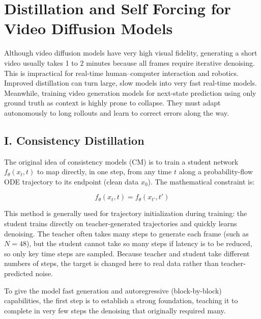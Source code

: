 \setcounter{section}{3}

\hypertarget{distillation-and-self-forcing-for-video-diffusion-models}{%
\section{Distillation and Self Forcing for Video Diffusion Models}\label{distillation-and-self-forcing-for-video-diffusion-models}}

Although video diffusion models have very high visual fidelity, generating a short video usually takes 1 to 2 minutes because all frames require iterative denoising. This is impractical for real-time human--computer interaction and robotics. Improved distillation can turn large, slow models into very fast real-time models. Meanwhile, training video generation models for next-state prediction using only ground truth as context is highly prone to collapse. They must adapt autonomously to long rollouts and learn to correct errors along the way.

\hypertarget{i.-consistency-distillation}{%
\subsection{I. Consistency Distillation}\label{i.-consistency-distillation}}

The original idea of consistency models (CM) is to train a student network \(f_\theta(x_t,t)\) to map directly, in one step, from any time \(t\) along a probability-flow ODE trajectory to its endpoint (clean data \(x_0\)). The mathematical constraint is:

\[
f_\theta(x_t,t)=f_\theta(x_{t'},t')
\]

This method is generally used for trajectory initialization during training: the student trains directly on teacher-generated trajectories and quickly learns denoising. The teacher often takes many steps to generate each frame (such as \(N=48\)), but the student cannot take so many steps if latency is to be reduced, so only key time steps are sampled. Because teacher and student take different numbers of steps, the target is changed here to real data rather than teacher-predicted noise.

To give the model fast generation and autoregressive (block-by-block) capabilities, the first step is to establish a strong foundation, teaching it to complete in very few steps the denoising that originally required many.

